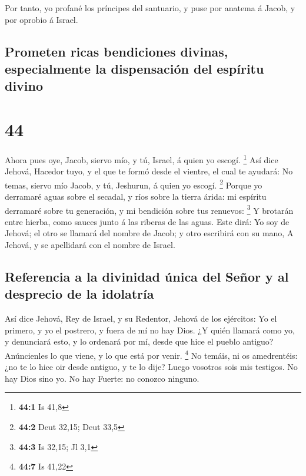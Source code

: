  Por tanto, yo profané los príncipes del santuario, y puse
por anatema á Jacob, y por oprobio á Israel.

\hypertarget{prometen-ricas-bendiciones-divinas-especialmente-la-dispensaciuxf3n-del-espuxedritu-divino}{%
\subsection{Prometen ricas bendiciones divinas, especialmente la
dispensación del espíritu
divino}\label{prometen-ricas-bendiciones-divinas-especialmente-la-dispensaciuxf3n-del-espuxedritu-divino}}

\hypertarget{section-43}{%
\section{44}\label{section-43}}

 Ahora pues oye, Jacob, siervo mío, y tú, Israel, á quien yo
escogí. \footnote{\textbf{44:1} Is 41,8}  Así dice Jehová,
Hacedor tuyo, y el que te formó desde el vientre, el cual te ayudará: No
temas, siervo mío Jacob, y tú, Jeshurun, á quien yo escogí. \footnote{\textbf{44:2}
  Deut 32,15; Deut 33,5}  Porque yo derramaré aguas sobre el
secadal, y ríos sobre la tierra árida: mi espíritu derramaré sobre tu
generación, y mi bendición sobre tus renuevos: \footnote{\textbf{44:3}
  Is 32,15; Jl 3,1}  Y brotarán entre hierba, como sauces
junto á las riberas de las aguas.  Este dirá: Yo soy de
Jehová; el otro se llamará del nombre de Jacob; y otro escribirá con su
mano, A Jehová, y se apellidará con el nombre de Israel.

\hypertarget{referencia-a-la-divinidad-uxfanica-del-seuxf1or-y-al-desprecio-de-la-idolatruxeda}{%
\subsection{Referencia a la divinidad única del Señor y al desprecio de
la
idolatría}\label{referencia-a-la-divinidad-uxfanica-del-seuxf1or-y-al-desprecio-de-la-idolatruxeda}}

 Así dice Jehová, Rey de Israel, y su Redentor, Jehová de
los ejércitos: Yo el primero, y yo el postrero, y fuera de mí no hay
Dios.  ¿Y quién llamará como yo, y denunciará esto, y lo
ordenará por mí, desde que hice el pueblo antiguo? Anúncienles lo que
viene, y lo que está por venir. \footnote{\textbf{44:7} Is 41,22}
 No temáis, ni os amedrentéis: ¿no te lo hice oir desde
antiguo, y te lo dije? Luego vosotros sois mis testigos. No hay Dios
sino yo. No hay Fuerte: no conozco ninguno.

